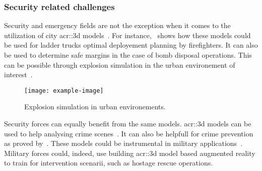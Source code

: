         \subsubsection{Security related challenges}
            Security and emergency fields are not the exception when it comes to the utilization of city \gls{acr::3d} models~\parencite{kwan2005emergency, ruppel2011designing}. 
            For instance,~\textcite{chen2014application} shows how these models could be used for ladder trucks optimal deployement planning by firefighters. 
            It can also be used to determine safe margins in the case of bomb disposal operations. 
            This can be possible through explosion simulation in the urban environement of interest~\parencite{willenborg2015simulation}.\\
            \begin{figure}[htpb]
                \centering
                \texttt{[image: example-image]}             
                \caption{
                    \label{fig::explosion_simulation} Explosion simulation in urban environements.
                }
            \end{figure}
            Security forces can equally benefit from the same models. 
            \gls{acr::3d} models can be used to help analysing crime scenes~\parencite{wolff2009towards}. 
            It can also be helpfull for crime prevention as proved by~\textcite{wolff2008geospatial}. 
            These models could be instrumental in military applications~\textcite{zlatanova2002trends, budroni2010automatic}. 
            Military forces could, indeed, use building \gls{acr::3d} model based augmented reality to train for intervention scenarii, such as hostage rescue operations.


